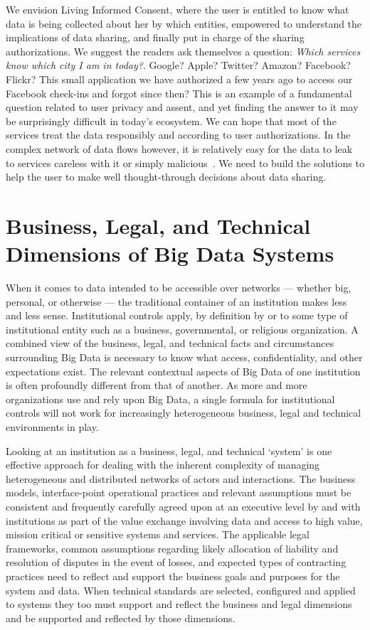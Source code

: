We envision Living Informed Consent, where the user is entitled to know what data is being collected about her by which entities, empowered to understand the implications of data sharing, and finally put in charge of the sharing authorizations.
We suggest the readers ask themselves a question: \emph{Which services know which city I am in today?}.
Google? Apple? Twitter? Amazon? Facebook? Flickr?
This small application we have authorized a few years ago to access our Facebook check-ins and forgot since then? 
This is an example of a fundamental question related to user privacy and assent, and yet finding the answer to it may be surprisingly difficult in today's ecosystem.
We can hope that most of the services treat the data responsibly and according to user authorizations.
In the complex network of data flows however, it is relatively easy for the data to leak to services careless with it or simply malicious~\cite{biltongirls}.
We need to build the solutions to help the user to make well thought-through decisions about data sharing.



\section{Business, Legal, and Technical Dimensions of Big Data Systems }

When it comes to data intended to be accessible over networks --- whether big, personal, or otherwise --- the traditional container of an institution makes less and less sense.
Institutional controls apply, by definition by or to some type of institutional entity such as a business, governmental, or religious organization.
A combined view of the business, legal, and technical facts and circumstances surrounding Big Data is necessary to know what access, confidentiality, and other expectations exist.
The relevant contextual aspects of Big Data of one institution is often profoundly different from that of another.
As more and more organizations use and rely upon Big Data, a single formula for institutional controls will not work for increasingly heterogeneous business, legal and technical environments in play.

Looking at an institution as a business, legal, and technical `system' is one effective approach for dealing with the inherent complexity of managing heterogeneous and distributed networks of actors and interactions.
The business models, interface-point operational practices and relevant assumptions must be consistent and frequently carefully agreed upon at an executive level by and with institutions as part of the value exchange involving data and access to high value, mission critical or sensitive systems and services.
The applicable legal frameworks, common assumptions regarding likely allocation of liability and resolution of disputes in the event of losses, and expected types of contracting practices need to reflect and support the business goals and purposes for the system and data.
When technical standards are selected, configured and applied to systems they too must support and reflect the business and legal dimensions and be supported and reflected by those dimensions.

